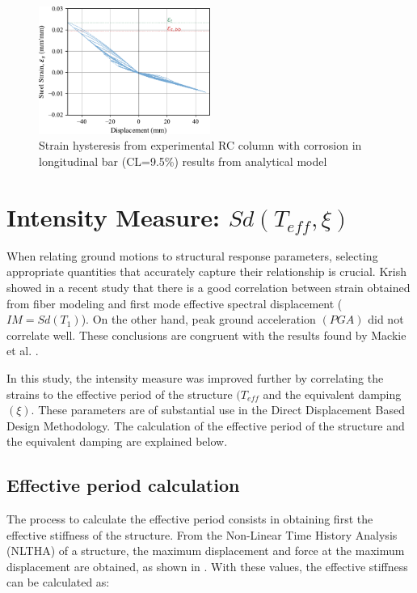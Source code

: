 \begin{figure}[htbp]
	\centering
	\includegraphics[width=0.5\textwidth]{VAC Thesis 2.0/Chapter-5/figs/Calibration_Ma_et_al_strain.pdf}
	\caption{Strain hysteresis from experimental RC column with corrosion in longitudinal bar (CL=9.5\%) results from analytical model}
	\label{fig:ModelCalibration_Corrosion_Hysteresis}
\end{figure}

\section{Intensity Measure: $Sd(T_{eff},\xi)$}

When relating ground motions to structural response parameters, selecting appropriate quantities that accurately capture their relationship is crucial. Krish \cite{Krish2018} showed in a recent study that there is a good correlation between strain obtained from fiber modeling and first mode effective spectral displacement ($IM=Sd(T_1)$). On the other hand, peak ground acceleration $(PGA)$ did not correlate well. These conclusions are congruent with the results found by Mackie et al. \cite{Mackie2003}. 

In this study, the intensity measure was improved further by correlating the strains to the effective period of the structure $(T_{eff}$ and the equivalent damping $(\xi)$. These parameters are of substantial use in the Direct Displacement Based Design Methodology. The calculation of the effective period of the structure and the equivalent damping are explained below.

\subsection{Effective period calculation}

The process to calculate the effective period consists in obtaining first the effective stiffness of the structure. From the Non-Linear Time History Analysis (NLTHA) of a structure, the maximum displacement and force at the maximum displacement are obtained, as shown in . With these values, the effective stiffness can be calculated as:

